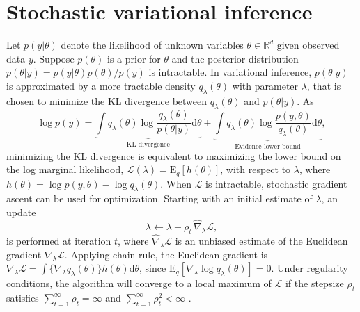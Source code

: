 \documentclass{statsoc}
\newcommand\df{{\text{d}}}
\newcommand\E{{\text{E}}}
\newcommand\mL{{\mathcal{L}}}
\begin{document}
\section{Stochastic variational inference} \label{sec_SVI}
Let $p(y|\theta)$ denote the likelihood of unknown variables $\theta \in \mathbb{R}^d$ given observed data $y$. Suppose $p(\theta)$ is a prior for $\theta$ and the posterior distribution $p(\theta|y) = p(y|\theta)p(\theta)/p(y)$ is intractable. In variational inference, $p(\theta|y)$ is approximated by a more tractable density $q_\lambda(\theta)$ with parameter $\lambda$, that is chosen to minimize the KL divergence between $q_\lambda(\theta)$ and $p(\theta|y)$. As
\[
\log p(y) = \underbrace{\int q_\lambda(\theta) \log \frac{q_\lambda(\theta)}{p(\theta|y)} \df \theta}_{\text{KL divergence}} + \underbrace{\int q_\lambda(\theta) \log \frac{p(y, \theta)}{q_\lambda(\theta)} \df \theta}_{\text{Evidence lower bound}},
\]
minimizing the KL divergence is equivalent to maximizing the lower bound on the log marginal likelihood, $\mL(\lambda) = \E_q [h(\theta)]$, with respect to $\lambda$, where $h(\theta) =\log p(y, \theta) - \log   q_\lambda (\theta)$. When $\mL$ is intractable, stochastic gradient ascent can be used for optimization. Starting with an initial estimate of $\lambda$, an update 
\[
\lambda \leftarrow \lambda + \rho_t \, \widehat{\nabla}_{\lambda} \mL,
\]
is performed at iteration $t$, where $\widehat{\nabla}_{\lambda} \mL$ is an unbiased estimate of the Euclidean gradient $\nabla_{\lambda} \mL$. Applying chain rule, the Euclidean gradient is $\nabla_\lambda \mL = \int \{\nabla_\lambda q_\lambda (\theta)\} h(\theta) \df \theta$, since $\E_q[\nabla_\lambda \log q_\lambda (\theta)] = 0$. Under regularity conditions, the algorithm will converge to a local maximum of $\mL$ if the stepsize $\rho_t$ satisfies $\sum_{t=1}^\infty \rho_t = \infty$ and $\sum_{t=1}^\infty \rho_t^2 < \infty$ \citep{Spall2003}.
\end{document}
